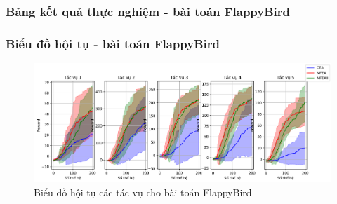\subsubsection{Bảng kết quả thực nghiệm - bài toán FlappyBird}
\begin{table} [H]
    \begin{center}
    \caption{Kết quả huấn luyện các tác vụ cho bài toán FlappyBird}

    \end{center}
    \label{tab:result:pixelcopter}
\end{table}


\subsubsection{Biểu đồ hội tụ - bài toán FlappyBird}
\begin{figure}[h!]
    \centering
    \includegraphics[width=\textwidth,height=\textheight,keepaspectratio]{thesis/images/results/rl/flappybird_conv.png}
    \caption{Biểu đồ hội tụ các tác vụ cho bài toán FlappyBird}
    \label{fig:FLP_conv}
\end{figure}

